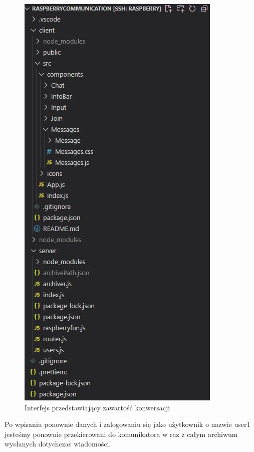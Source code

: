 \begin{figure}
	\centering
	\includegraphics[width=0.5\linewidth]{"obrazy/model"}
	\caption{Interfejs przedstawiający zawartość konwersacji}
	\label{fig:50}
\end{figure}
Po wpisaniu ponownie danych i zalogowaniu się jako użytkownik o nazwie user1 jesteśmy ponownie przekierowani do komunikatora w raz z całym archiwum wysłanych dotychczas wiadomości.
